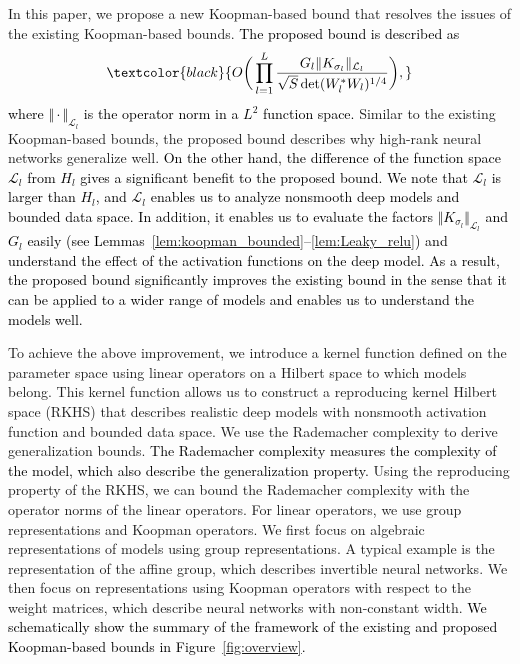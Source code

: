 \documentclass[twoside]{article}
\def\mcl#1{\mathcal{#1}}
\def\opn{\operatorname}
\def\red#1{\textcolor{black}{#1}}
\begin{document}
In this paper, we propose a new Koopman-based bound that resolves the issues of the existing Koopman-based bounds.
\red{The proposed bound is described as}
\begin{align*}
\red{O\bigg(\prod_{l=1}^L\frac{G_l\Vert K_{\sigma_l} \Vert_{\mcl{L}_l} }{\sqrt{S}\opn{det}(W_l^*W_l)^{1/4}}\bigg),}
\end{align*}
\red{where $\Vert \cdot\Vert_{\mcl{L}_l}$ is the operator norm in a $L^2$ function space.}
Similar to the existing Koopman-based bounds, the proposed bound describes why high-rank neural networks generalize well.
\red{On the other hand, the difference of the function space $\mcl{L}_l$ from $H_l$ gives a significant benefit to the proposed bound.
We note that $\mcl{L}_l$ is larger than $H_l$, and $\mcl{L}_l$ enables us to analyze nonsmooth deep models and bounded data space.
In addition, it enables us to evaluate the factors $\Vert K_{\sigma_l}\Vert_{\mcl{L}_l}$ and $G_l$ easily (see Lemmas~\ref{lem:koopman_bounded}--\ref{lem:Leaky_relu}) and understand the effect of the activation functions on the deep model.
As a result, the proposed bound significantly improves the existing bound in the sense that it can be applied to a wider range of models and enables us to understand the models well.}

To achieve the above improvement, we introduce a kernel function defined on the parameter space using linear operators on a Hilbert space to which models belong.
This kernel function allows us to construct a reproducing kernel Hilbert space (RKHS) that describes realistic deep models with nonsmooth activation function and bounded data space.
We use the Rademacher complexity to derive generalization bounds.
\red{The Rademacher complexity measures the complexity of the model, which also describe the generalization property.}
Using the reproducing property of the RKHS, we can bound the Rademacher complexity with the operator norms of the linear operators.
For linear operators, we use group representations and Koopman operators. 
We first focus on algebraic representations of models using group representations.
A typical example is the representation of the affine group, which describes invertible neural networks.
We then focus on representations using Koopman operators with respect to the weight matrices, which describe neural networks with non-constant width.
\red{We schematically show the summary of the framework of the existing and proposed Koopman-based bounds in Figure~\ref{fig:overview}.}
\end{document}
